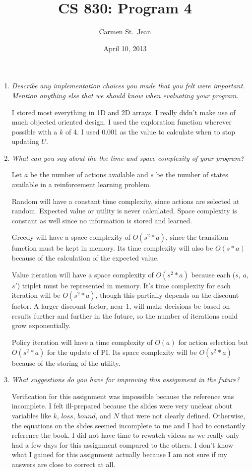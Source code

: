 \documentclass[letterpaper,11pt]{article}
\begin{document}
\title{CS 830: Program 4}
\date{April 10, 2013}
\author{Carmen St.\ Jean}

\maketitle

\begin{enumerate}
\item \emph{Describe any implementation choices you made that you felt were important. Mention anything else that we should know when evaluating your program.}

I stored most everything in 1D and 2D arrays.  I really didn't make use of much objected oriented design.  I used the exploration function wherever possible with a $k$ of 4.  I used 0.001 as the value to calculate when to stop updating $U$.
\item \emph{What can you say about the the time and space complexity of your
program?}

Let $a$ be the number of actions available and $s$ be the number of states available in a reinforcement learning problem.

Random will have a constant time complexity, since actions are selected at random.  Expected value or utility is never calculated.  Space complexity is constant as well since no information is stored and learned.

Greedy will have a space complexity of $O(s^2 * a)$, since the transition function must be kept in memory.  Its time complexity will also be $O(s * a)$ because of the calculation of the expected value.

Value iteration will have a space complexity of $O(s^2 * a)$ because each ($s$, $a$, $s'$) triplet must be represented in memory.  It's time complexity for each iteration will be $O(s^2 * a)$, though this partially depends on the discount factor.  A larger discount factor, near 1, will make decisions be based on results further and further in the future, so the number of iterations could grow exponentially.

Policy iteration will have a time complexity of $O(a)$ for action selection but $O(s^2 * a)$ for the update of PI.  Its space complexity will be $O(s^2 * a)$ because of the storing of the utility.
\item \emph{What suggestions do you have for improving this assignment in the future?}

Verification for this assignment was impossible because the reference was incomplete.  I felt ill-prepared because the slides were very unclear about variables like $k$, $loss$, $bound$, and $N$ that were not clearly defined.  Otherwise, the equations on the slides seemed incomplete to me and I had to constantly reference the book.  I did not have time to rewatch videos as we really only had a few days for this assignment compared to the others.  I don't know what I gained for this assignment actually because I am not sure if my answers are close to correct at all.
\end{enumerate}
\end{document}
